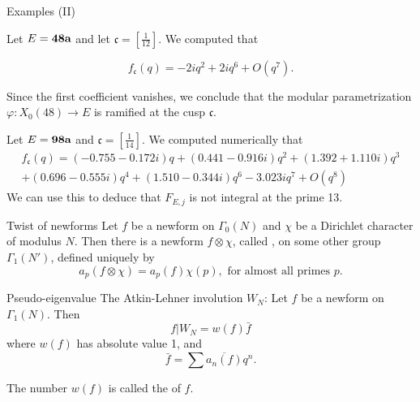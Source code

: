 \documentclass[handout]{beamer}
\newcommand{\fc}{\mathfrak{c}}
\begin{document}
\begin{frame}{Examples (II)}

\begin{Example}
Let $E = {\bf 48a}$ and let $\fc = \left[\frac{1}{12}\right]$.  We computed that 

$$f_\fc(q) =  -2iq^2 + 2iq^6 + O(q^7).$$

Since the first coefficient vanishes, we conclude that the modular parametrization $\varphi: X_0(48) \to E$ is ramified at the cusp $\fc$. 
\end{Example}

\begin{Example}
Let $E = {\bf 98a}$ and $\fc = [\frac{1}{14}]$. We computed numerically that 
{\footnotesize
\begin{align*}
f_\fc(q) = \left(-0.755 - 0.172i\right)q + \left(0.441 - 0.916i\right)q^{2} 
+ \left(1.392+ 1.110i\right)q^{3} \\ + \left(0.696 - 0.555i\right)q^{4} 
+ \left(1.510 - 0.344i\right)q^{6} - 3.023i q^{7} + O(q^8) 
\end{align*}
}
We can use this to deduce that $F_{E,j}$ is not integral at the prime 13. 
\end{Example}


\end{frame}

\begin{frame}{Twist of newforms}
Let $f$ be a newform on $\Gamma_0(N)$ and $\chi$ be a Dirichlet character of modulus $N$. Then there is a
newform $f \otimes \chi$, called , on some other group $\Gamma_1(N')$, defined uniquely by 
\[
	a_p(f \otimes \chi) = a_p(f) \chi(p), \mbox{ for almost all primes } p. 
\]


\end{frame}

\begin{frame}{Pseudo-eigenvalue}
The Atkin-Lehner involution $W_N$:  Let $f$ be a newform on $\Gamma_1(N)$. Then  
\[
	f | W_N = w(f) \bar{f}
\]
where $w(f)$ has absolute value 1, and 
\[
	\bar{f} = \sum \overline{a_n(f)} q^n. 
\]

The number $w(f)$ is called the  of $f$. 
\end{frame}
\end{document}
